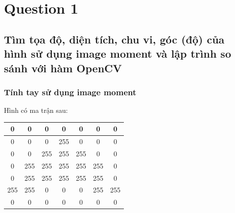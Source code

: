 \section{Question 1}
     \subsection{Tìm tọa độ, diện tích, chu vi, góc (độ) của hình sử dụng image moment và lập trình so sánh với hàm OpenCV}
          \subsubsection{Tính tay sử dụng image moment}
               \hspace*{0.6cm}Hình có ma trận sau:
               \begin{table}[h]
                    \centering
                    \begin{tabular}{|c|c|c|c|c|c|c|}
                    \hline
                    0 & 0 & 0 & 0 & 0 & 0 & 0 \\ \hline
                    0 & 0 & 0 & 255 & 0 & 0 & 0 \\ \hline
                    0 & 0 & 255 & 255 & 255 & 0 & 0 \\ \hline
                    0 & 255 & 255 & 255 & 255 & 255 & 0 \\ \hline
                    0 & 255 & 255 & 255 & 255 & 255 & 0 \\ \hline
                    255 & 255 & 0 & 0 & 0 & 255 & 255 \\ \hline
                    0 & 0 & 0 & 0 & 0 & 0 & 0 \\ \hline
                    \end{tabular}
               \end{table}
